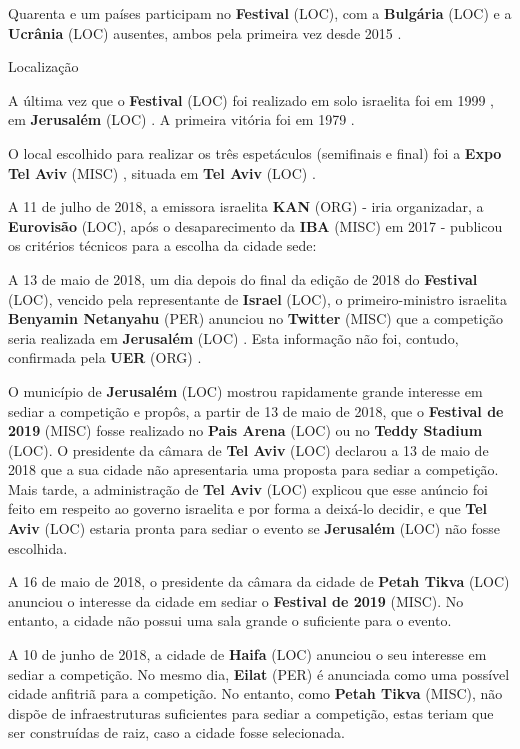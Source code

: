 \documentclass[12pt,a4paper]{article}
\begin{document}
Quarenta e um países participam no \textbf{Festival} (LOC), com a \textbf{Bulgária} (LOC) e a \textbf{Ucrânia} (LOC) ausentes, ambos pela primeira vez desde 2015 .



Localização

A última vez que o \textbf{Festival} (LOC) foi realizado em solo israelita foi em 1999 , em \textbf{Jerusalém} (LOC) . A primeira vitória foi em 1979 .

O local escolhido para realizar os três espetáculos (semifinais e final) foi a \textbf{Expo Tel Aviv} (MISC) , situada em \textbf{Tel Aviv} (LOC) .

A 11 de julho de 2018, a emissora israelita \textbf{KAN} (ORG) - iria organizadar, a \textbf{Eurovisão} (LOC), após o desaparecimento da \textbf{IBA} (MISC) em 2017 - publicou os critérios técnicos para a escolha da cidade sede:

A 13 de maio de 2018, um dia depois do final da edição de 2018 do \textbf{Festival} (LOC), vencido pela representante de \textbf{Israel} (LOC), o primeiro-ministro israelita \textbf{Benyamin Netanyahu} (PER) anunciou no \textbf{Twitter} (MISC) que a competição seria realizada em \textbf{Jerusalém} (LOC) . Esta informação não foi, contudo, confirmada pela \textbf{UER} (ORG) .

O município de \textbf{Jerusalém} (LOC) mostrou rapidamente grande interesse em sediar a competição e propôs, a partir de 13 de maio de 2018, que o \textbf{Festival de 2019} (MISC) fosse realizado no \textbf{Pais Arena} (LOC) ou no \textbf{Teddy Stadium} (LOC). O presidente da câmara de \textbf{Tel Aviv} (LOC) declarou a 13 de maio de 2018 que a sua cidade não apresentaria uma proposta para sediar a competição. Mais tarde, a administração de \textbf{Tel Aviv} (LOC) explicou que esse anúncio foi feito em respeito ao governo israelita e por forma a deixá-lo decidir, e que \textbf{Tel Aviv} (LOC) estaria pronta para sediar o evento se \textbf{Jerusalém} (LOC) não fosse escolhida.

A 16 de maio de 2018, o presidente da câmara da cidade de \textbf{Petah Tikva} (LOC) anunciou o interesse da cidade em sediar o \textbf{Festival de 2019} (MISC). No entanto, a cidade não possui uma sala grande o suficiente para o evento.

A 10 de junho de 2018, a cidade de \textbf{Haifa} (LOC) anunciou o seu interesse em sediar a competição. No mesmo dia, \textbf{Eilat} (PER) é anunciada como uma possível cidade anfitriã para a competição. No entanto, como \textbf{Petah Tikva} (MISC), não dispõe de infraestruturas suficientes para sediar a competição, estas teriam que ser construídas de raiz, caso a cidade fosse selecionada.
\end{document}
